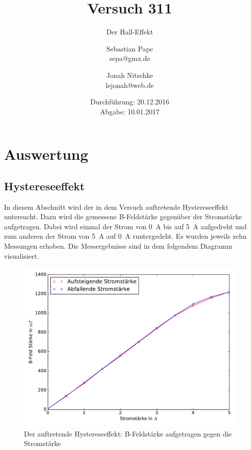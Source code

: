 



\title{Versuch 311}
\subtitle{Der Hall-Effekt}
\author{Sebastian Pape\\
        sepa@gmx.de \and
        Jonah Nitschke\\
        lejonah@web.de}
\date{Durchführung: 20.12.2016\\
      Abgabe: 10.01.2017}

\maketitle






\newpage

\section{Auswertung}

\subsection{Hystereseeffekt}

In diesem Abschnitt wird der in dem Versuch auftretende Hystereseeffekt untersucht.
Dazu wird die gemessene B-Feldstärke gegenüber der Stromstärke aufgetragen. Dabei
wird einmal der Strom von \SI{0}{\ampere} bis auf \SI{5}{\ampere} aufgedreht und zum
anderen der Strom von \SI{5}{\ampere} auf \SI{0}{\ampere} runtergedeht.
Es wurden jeweils zehn Messungen erhoben. Die Messergebnisse sind in dem folgendem
Diagramm visualisiert.

\begin{figure}
  \includegraphics[width=\textwidth]{Hysterese.pdf}
  \caption{Der auftretende Hystereseeffekt: B-Feldstärke aufgetragen gegen die Stromstärke}
  \label{fig:Hysterese}
\end{figure}

